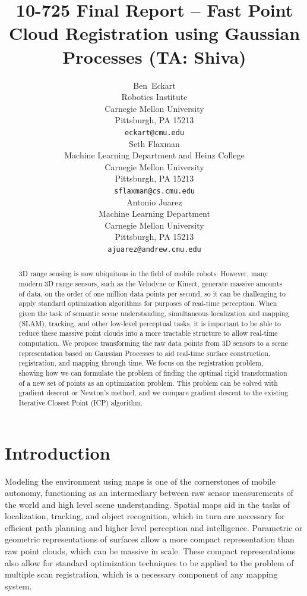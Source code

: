 \documentclass{article} %
\title{10-725 Final Report -- Fast Point Cloud Registration using Gaussian Processes (TA: Shiva)}
\author{
Ben~Eckart\\
Robotics Institute\\
Carnegie Mellon University\\
Pittsburgh, PA 15213 \\
\texttt{eckart@cmu.edu} \\
\And
Seth Flaxman \\
Machine Learning Department and Heinz College\\
Carnegie Mellon University\\
Pittsburgh, PA 15213 \\
\texttt{sflaxman@cs.cmu.edu} \\
\And
Antonio Juarez \\
Machine Learning Department\\
Carnegie Mellon University\\
Pittsburgh, PA 15213 \\
\texttt{ajuarez@andrew.cmu.edu} \\
}
\begin{document}
\maketitle

\begin{abstract}

3D range sensing is now ubiquitous in the field of mobile robots. However, many modern 3D range sensors, such as the Velodyne or Kinect, generate massive amounts of data, on the order of one million data points per second,  so it can be challenging to apply standard optimization algorithms for purposes of real-time perception. When given the task of semantic scene understanding, simultaneous localization and mapping (SLAM), tracking, and other low-level perceptual tasks, it is important to be able to reduce these massive point clouds into a more tractable structure to allow real-time computation. We propose transforming the raw data points from 3D sensors to a scene representation based on Gaussian Processes to aid real-time surface construction, registration, and mapping through time. We focus on the registration problem, showing how we can formulate the problem of finding the optimal rigid transformation of a new set of points as an optimization problem. This problem can be solved with gradient descent or Newton's method, and we compare gradient descent to the existing Iterative Closest Point (ICP) algorithm.

\end{abstract}

\section{Introduction}

Modeling the environment using maps is one of the cornerstones of mobile autonomy, functioning as an intermediary between raw sensor measurements of the world and high level scene understanding. Spatial maps aid in the tasks of localization, tracking, and object recognition, which in turn are necessary for efficient path planning and higher level perception and intelligence. Parametric or geometric representations of surfaces allow a more compact representation than raw point clouds, which can be massive in scale. These compact representations also allow for standard optimization techniques to be applied to the problem of multiple scan registration, which is a necessary component of any mapping system.
\end{document}

